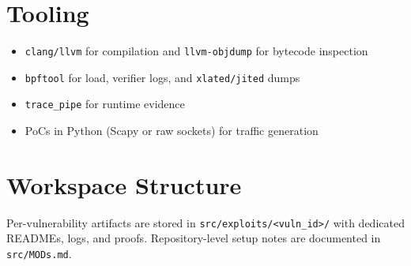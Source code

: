 \section{Tooling}
\begin{itemize}
  \item \texttt{clang/llvm} for compilation and \texttt{llvm-objdump} for bytecode inspection
  \item \texttt{bpftool} for load, verifier logs, and \texttt{xlated/jited} dumps
  \item \texttt{trace\_pipe} for runtime evidence
  \item PoCs in Python (Scapy or raw sockets) for traffic generation
\end{itemize}

\section{Workspace Structure}
Per-vulnerability artifacts are stored in \texttt{src/exploits/<vuln\_id>/} with dedicated READMEs, logs, and proofs. Repository-level setup notes are documented in \texttt{src/MODs.md}.
